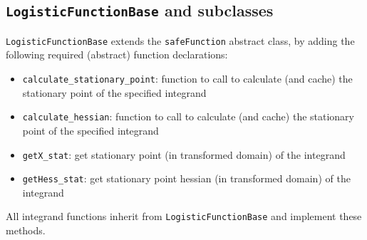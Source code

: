 \subsection*{\texttt{LogisticFunctionBase} and subclasses}

\texttt{LogisticFunctionBase} extends the \texttt{safeFunction} abstract class, by adding the following required (abstract) function declarations:
\begin{itemize}[noitemsep]
    \item \texttt{calculate\_stationary\_point}: function to call to calculate (and cache) the stationary point of the specified integrand
    \item \texttt{calculate\_hessian}: function to call to calculate (and cache) the stationary point of the specified integrand
    \item \texttt{getX\_stat}: get stationary point (in transformed domain) of the integrand
    \item \texttt{getHess\_stat}: get stationary point hessian (in transformed domain) of the integrand
\end{itemize}

All integrand functions inherit from \texttt{LogisticFunctionBase} and implement these methods.

